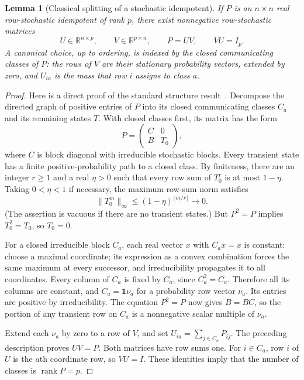 \documentclass[11pt]{article}
\numberwithin{equation}{section}
\newtheorem{lemma}[theorem]{Lemma}
\theoremstyle{definition}
\theoremstyle{remark}
\newcommand{\R}{\mathbb R}
\newcommand{\one}{\mathbf 1}
\newcommand{\rank}{\operatorname{rank}}
\begin{document}
\begin{lemma}[Classical splitting of a stochastic idempotent]\label{markov:lem:splitting}
If $P$ is an $n\times n$ real row-stochastic idempotent of rank $p$, there exist
nonnegative row-stochastic matrices
\[
 U\in\R^{n\times p},\qquad V\in\R^{p\times n},
 \qquad P=UV,\qquad VU=I_p.
\]
A canonical choice, up to ordering, is indexed by the closed communicating
classes of $P$: the rows of $V$ are their stationary probability vectors, extended
by zero, and $U_{ia}$ is the mass that row $i$ assigns to class $a$.
\end{lemma}

\begin{proof}
Here is a direct proof of the standard structure result~\cite{DGU}. Decompose
the directed graph of positive entries of $P$ into its closed communicating
classes $C_a$ and its remaining states $T$. With closed classes first, its matrix
has the form
\[
 P=\begin{pmatrix}C&0\\ B&T_0\end{pmatrix},
\]
where $C$ is block diagonal with irreducible stochastic blocks. Every transient
state has a finite positive-probability path to a closed class. By finiteness,
there are an integer $r\ge1$ and a real $\eta>0$ such that every row sum of $T_0^r$
is at most $1-\eta$. Taking $0<\eta<1$ if necessary, the maximum-row-sum
norm satisfies
\[
 \|T_0^m\|_\infty\le(1-\eta)^{\lfloor m/r\rfloor}\longrightarrow0.
\]
(The assertion is vacuous if there are no transient states.) But $P^2=P$
implies $T_0^2=T_0$, so $T_0=0$.

For a closed irreducible block $C_a$, each real vector $x$ with $C_ax=x$ is
constant: choose a maximal coordinate; its expression as a convex combination
forces the same maximum at every successor, and irreducibility propagates it to
all coordinates. Every column of $C_a$ is fixed by $C_a$, since $C_a^2=C_a$.
Therefore all its columns are constant, and
$C_a=\one\nu_a$ for a probability row vector $\nu_a$. Its entries are positive
by irreducibility. The equation $P^2=P$ now gives $B=BC$, so the portion of any
transient row on $C_a$ is a nonnegative scalar multiple of $\nu_a$.

Extend each $\nu_a$ by zero to a row of $V$, and set
$U_{ia}=\sum_{j\in C_a}P_{ij}$. The preceding description proves $UV=P$.
Both matrices have row sums one. For $i\in C_a$, row $i$ of $U$ is the $a$th
coordinate row, so $VU=I$. These identities imply that the number of classes is
$\rank P=p$.
\end{proof}
\end{document}
